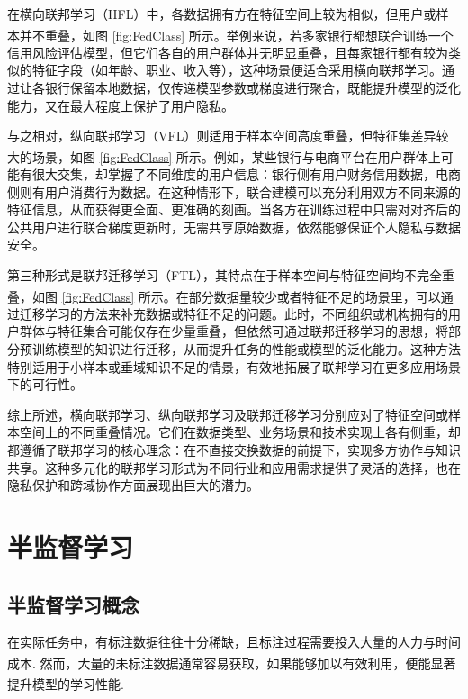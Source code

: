 

在横向联邦学习（HFL）中，各数据拥有方在特征空间上较为相似，但用户或样本并不重叠\textsuperscript{\cite{yang2019federated,liu2019communication}}，如图 \ref{fig:FedClass}  所示。举例来说，若多家银行都想联合训练一个信用风险评估模型，但它们各自的用户群体并无明显重叠，且每家银行都有较为类似的特征字段（如年龄、职业、收入等），这种场景便适合采用横向联邦学习。通过让各银行保留本地数据，仅传递模型参数或梯度进行聚合，既能提升模型的泛化能力，又在最大程度上保护了用户隐私。

与之相对，纵向联邦学习（VFL）则适用于样本空间高度重叠，但特征集差异较大的场景\textsuperscript{\cite{liu2020secure,chen2020vafl}}，如图 \ref{fig:FedClass}  所示。例如，某些银行与电商平台在用户群体上可能有很大交集，却掌握了不同维度的用户信息：银行侧有用户财务信用数据，电商侧则有用户消费行为数据。在这种情形下，联合建模可以充分利用双方不同来源的特征信息，从而获得更全面、更准确的刻画。当各方在训练过程中只需对对齐后的公共用户进行联合梯度更新时，无需共享原始数据，依然能够保证个人隐私与数据安全。

第三种形式是联邦迁移学习（FTL），其特点在于样本空间与特征空间均不完全重叠\textsuperscript{\cite{yang2019federated,chen2020vafl}}，如图 \ref{fig:FedClass}  所示。在部分数据量较少或者特征不足的场景里，可以通过迁移学习的方法来补充数据或特征不足的问题。此时，不同组织或机构拥有的用户群体与特征集合可能仅存在少量重叠，但依然可通过联邦迁移学习的思想，将部分预训练模型的知识进行迁移，从而提升任务的性能或模型的泛化能力。这种方法特别适用于小样本或垂域知识不足的情景，有效地拓展了联邦学习在更多应用场景下的可行性。

综上所述，横向联邦学习、纵向联邦学习及联邦迁移学习分别应对了特征空间或样本空间上的不同重叠情况。它们在数据类型、业务场景和技术实现上各有侧重，却都遵循了联邦学习的核心理念：在不直接交换数据的前提下，实现多方协作与知识共享。这种多元化的联邦学习形式为不同行业和应用需求提供了灵活的选择，也在隐私保护和跨域协作方面展现出巨大的潜力。



\section{半监督学习}
\subsection{半监督学习概念}
在实际任务中，有标注数据往往十分稀缺，且标注过程需要投入大量的人力与时间成本\textsuperscript{\cite{chapelle2009semi}}. 然而，大量的未标注数据通常容易获取，如果能够加以有效利用，便能显著提升模型的学习性能\textsuperscript{\cite{zhu2005semi}}.

